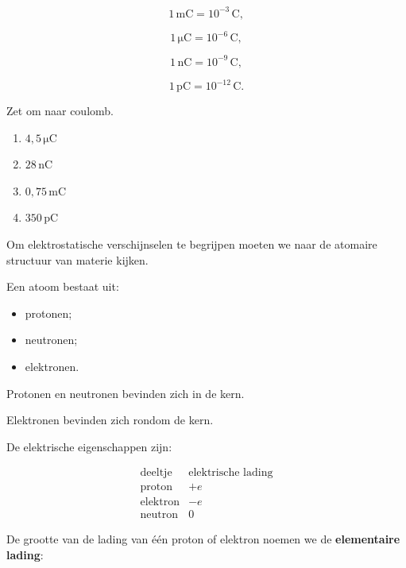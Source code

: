 \documentclass{ximera}
\begin{document}
\[
1\,\mathrm{mC}=10^{-3}\,\mathrm C,
\]

\[
1\,\mathrm{\mu C}=10^{-6}\,\mathrm C,
\]

\[
1\,\mathrm{nC}=10^{-9}\,\mathrm C,
\]

\[
1\,\mathrm{pC}=10^{-12}\,\mathrm C.
\]


\begin{oefening}[Voorvoegsels]{\oefB\ESS}

Zet om naar coulomb.

\begin{enumerate}
  \item $4{,}5\,\mathrm{\mu C}$
  \item $28\,\mathrm{nC}$
  \item $0{,}75\,\mathrm{mC}$
  \item $350\,\mathrm{pC}$
\end{enumerate}

\end{oefening}




Om elektrostatische verschijnselen te begrijpen moeten we naar de
atomaire structuur van materie kijken.

Een atoom bestaat uit:

\begin{itemize}
  \item protonen;
  \item neutronen;
  \item elektronen.
\end{itemize}

Protonen en neutronen bevinden zich in de kern.

Elektronen bevinden zich rondom de kern.


De elektrische eigenschappen zijn:

\[
\begin{array}{c|c}
\text{deeltje} & \text{elektrische lading}\\
\hline
\text{proton} & +e\\
\text{elektron} & -e\\
\text{neutron} & 0
\end{array}
\]


De grootte van de lading van één proton of elektron noemen we de
\textbf{elementaire lading}:
\end{document}
